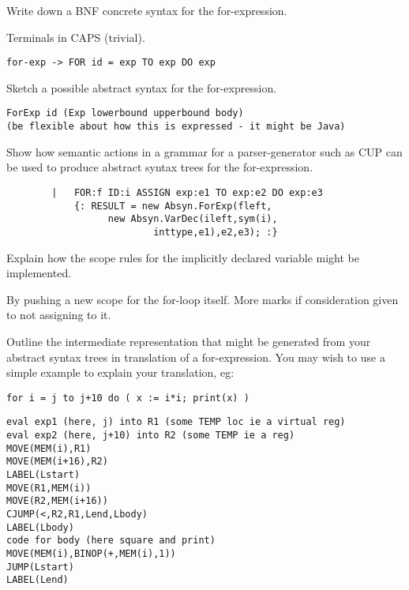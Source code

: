 \documentclass[11pt]{cityexam}
\begin{document}
\begin{questions}
\begin{subquestions}
\subquestion
Write down a BNF concrete syntax for the for-expression. 

\begin{modelanswer}
Terminals in CAPS (trivial).
\begin{verbatim}
for-exp -> FOR id = exp TO exp DO exp
\end{verbatim}
\end{modelanswer}

\subquestion
Sketch a possible abstract syntax for the for-expression.

\begin{modelanswer}
\begin{verbatim}
ForExp id (Exp lowerbound upperbound body) 
(be flexible about how this is expressed - it might be Java)
\end{verbatim}
\end{modelanswer}

\subquestion
Show how semantic actions in a grammar for a parser-generator such as CUP
can be used to produce abstract syntax trees for the for-expression.

\begin{modelanswer}
\begin{verbatim}
        |   FOR:f ID:i ASSIGN exp:e1 TO exp:e2 DO exp:e3
            {: RESULT = new Absyn.ForExp(fleft, 
                  new Absyn.VarDec(ileft,sym(i),
                          inttype,e1),e2,e3); :}
\end{verbatim}
\end{modelanswer}

\subquestion
Explain how the scope rules for the implicitly declared variable might
be implemented.

\begin{modelanswer}
By pushing a new scope for the for-loop itself. More marks if consideration
given to not assigning to it.
\end{modelanswer}

\subquestion
        Outline the intermediate representation
        that might be generated from your
	abstract syntax trees in translation of
        a for-expression.
	You may wish to use a simple example to explain your 
	translation, eg:
\begin{verbatim}
for i = j to j+10 do ( x := i*i; print(x) )
\end{verbatim}

\begin{modelanswer}
\begin{verbatim}
eval exp1 (here, j) into R1 (some TEMP loc ie a virtual reg)
eval exp2 (here, j+10) into R2 (some TEMP ie a reg)
MOVE(MEM(i),R1)
MOVE(MEM(i+16),R2)
LABEL(Lstart)
MOVE(R1,MEM(i))
MOVE(R2,MEM(i+16))
CJUMP(<,R2,R1,Lend,Lbody)
LABEL(Lbody)
code for body (here square and print)
MOVE(MEM(i),BINOP(+,MEM(i),1))
JUMP(Lstart)
LABEL(Lend)
\end{verbatim}
\end{modelanswer}


\end{subquestions}
\end{questions}
\end{document}
